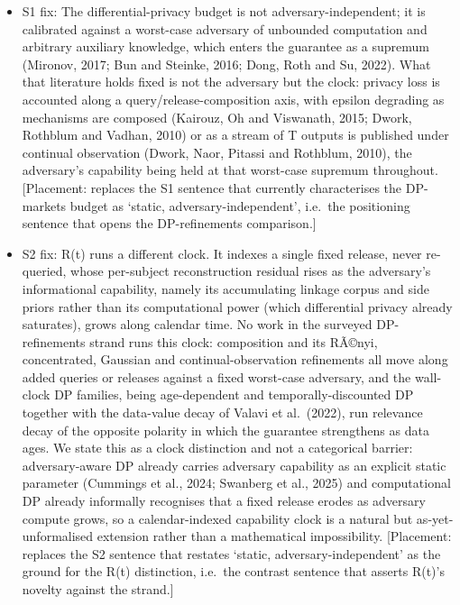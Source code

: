 \documentclass[
  11pt,
]{article}
\begin{document}
\begin{itemize}
\item
  S1 fix: The differential-privacy budget is not adversary-independent;
  it is calibrated against a worst-case adversary of unbounded
  computation and arbitrary auxiliary knowledge, which enters the
  guarantee as a supremum (Mironov, 2017; Bun and Steinke, 2016; Dong,
  Roth and Su, 2022). What that literature holds fixed is not the
  adversary but the clock: privacy loss is accounted along a
  query/release-composition axis, with epsilon degrading as mechanisms
  are composed (Kairouz, Oh and Viswanath, 2015; Dwork, Rothblum and
  Vadhan, 2010) or as a stream of T outputs is published under continual
  observation (Dwork, Naor, Pitassi and Rothblum, 2010), the adversary's
  capability being held at that worst-case supremum throughout.
  {[}Placement: replaces the S1 sentence that currently characterises
  the DP-markets budget as `static, adversary-independent', i.e.~the
  positioning sentence that opens the DP-refinements comparison.{]}
\item
  S2 fix: R(t) runs a different clock. It indexes a single fixed
  release, never re-queried, whose per-subject reconstruction residual
  rises as the adversary's informational capability, namely its
  accumulating linkage corpus and side priors rather than its
  computational power (which differential privacy already saturates),
  grows along calendar time. No work in the surveyed DP-refinements
  strand runs this clock: composition and its RÃ©nyi, concentrated,
  Gaussian and continual-observation refinements all move along added
  queries or releases against a fixed worst-case adversary, and the
  wall-clock DP families, being age-dependent and temporally-discounted
  DP together with the data-value decay of Valavi et al.~(2022), run
  relevance decay of the opposite polarity in which the guarantee
  strengthens as data ages. We state this as a clock distinction and not
  a categorical barrier: adversary-aware DP already carries adversary
  capability as an explicit static parameter (Cummings et al., 2024;
  Swanberg et al., 2025) and computational DP already informally
  recognises that a fixed release erodes as adversary compute grows, so
  a calendar-indexed capability clock is a natural but
  as-yet-unformalised extension rather than a mathematical
  impossibility. {[}Placement: replaces the S2 sentence that restates
  `static, adversary-independent' as the ground for the R(t)
  distinction, i.e.~the contrast sentence that asserts R(t)'s novelty
  against the strand.{]}
\end{itemize}
\end{document}
